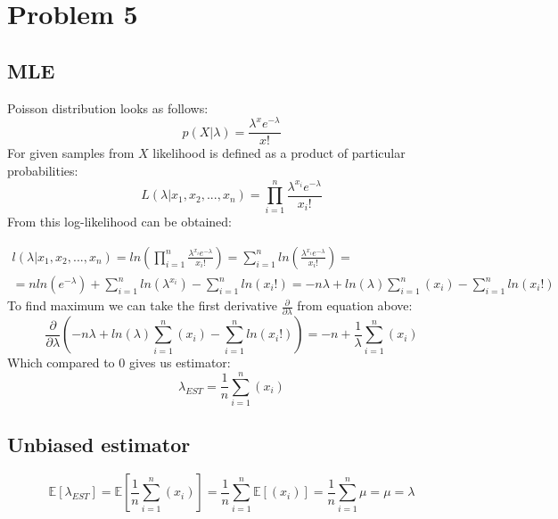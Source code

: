 \documentclass{article}
\begin{document}
\section{Problem 5}
\subsection{MLE}
Poisson distribution looks as follows:
\begin{equation}
    p(X|\lambda) = \frac{\lambda^xe^{-\lambda}}{x!}
\end{equation}
For given samples from $X$ likelihood is defined as a product of particular probabilities:
\begin{equation}
    L(\lambda|x_1,x_2,...,x_n) = \prod_{i=1}^n \frac{\lambda^{x_i}e^{-\lambda}}{x_i!}
\end{equation}
From this log-likelihood can be obtained:

\begin{multline}
    l(\lambda|x_1,x_2,...,x_n) = ln(\prod_{i=1}^n \frac{\lambda^{x_i}e^{-\lambda}}{x_i!}) = 
    \sum_{i=1}^n ln(\frac{\lambda^{x_i}e^{-\lambda}}{x_i!}) = \\
    = nln(e^{-\lambda}) + \sum_{i=1}^n ln(\lambda^{x_i}) - \sum_{i=1}^nln(x_i!) =
    -n\lambda + ln(\lambda) \sum_{i=1}^n(x_i) - \sum_{i=1}^nln(x_i!)
\end{multline}
To find maximum we can take the first derivative $\frac{\partial}{\partial\lambda}$ from equation above:
\begin{equation}
    \frac{\partial}{\partial\lambda} (-n\lambda + ln(\lambda) \sum_{i=1}^n(x_i) - \sum_{i=1}^nln(x_i!)) = 
    -n + \frac{1}{\lambda}\sum_{i=1}^n(x_i)    
\end{equation}
Which compared to 0 gives us estimator:
\begin{equation}
    \lambda_{EST} = \frac{1}{n}\sum_{i=1}^n(x_i)
\end{equation}
\subsection{Unbiased estimator}

\begin{equation}
    \mathbb{E}[\lambda_{EST}] = \mathbb{E}[\frac{1}{n}\sum_{i=1}^n(x_i)] = \frac{1}{n}\sum_{i=1}^n\mathbb{E}[(x_i)] = 
    \frac{1}{n} \sum_{i=1}^n \mu = \mu = \lambda 
\end{equation}
\end{document}
